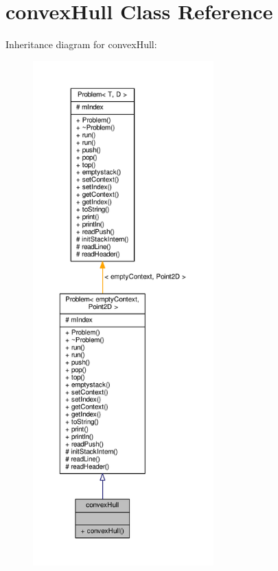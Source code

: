 \hypertarget{classconvex_hull}{}\section{convex\+Hull Class Reference}
\label{classconvex_hull}


Inheritance diagram for convex\+Hull\+:
\nopagebreak
\begin{figure}[H]
\begin{center}
\leavevmode
\includegraphics[height=550pt]{classconvex_hull__inherit__graph}
\end{center}
\end{figure}


